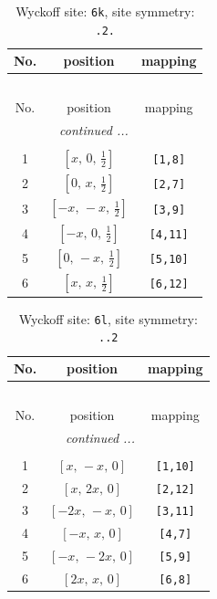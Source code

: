 \documentclass[fleqn,8pt]{jsarticle}
\begin{document}
\renewcommand{\arraystretch}{1.2}
\begin{longtable}{ccc}
\caption{Wyckoff site: {\tt 6k}, site symmetry: {\tt .2.}}
 \\
 \hline \hline
No. & position & mapping \\ \hline \endfirsthead

\multicolumn{2}{l}{\tablename\ \thetable{}} \\
 \hline \hline
No. & position & mapping \\ \hline \endhead

 \hline \hline
\multicolumn{2}{r}{\footnotesize\it continued ...} \\ \endfoot

 \hline \hline
\multicolumn{2}{r}{} \\ \endlastfoot

1 & $\left[ x,\, 0,\, \frac{1}{2} \right]$ & {\tt [1,8]} \\ \hline
2 & $\left[ 0,\, x,\, \frac{1}{2} \right]$ & {\tt [2,7]} \\ \hline
3 & $\left[ - x,\, - x,\, \frac{1}{2} \right]$ & {\tt [3,9]} \\ \hline
4 & $\left[ - x,\, 0,\, \frac{1}{2} \right]$ & {\tt [4,11]} \\ \hline
5 & $\left[ 0,\, - x,\, \frac{1}{2} \right]$ & {\tt [5,10]} \\ \hline
6 & $\left[ x,\, x,\, \frac{1}{2} \right]$ & {\tt [6,12]} \\
\end{longtable}
\renewcommand{\arraystretch}{1.2}
\begin{longtable}{ccc}
\caption{Wyckoff site: {\tt 6l}, site symmetry: {\tt ..2}}
 \\
 \hline \hline
No. & position & mapping \\ \hline \endfirsthead

\multicolumn{2}{l}{\tablename\ \thetable{}} \\
 \hline \hline
No. & position & mapping \\ \hline \endhead

 \hline \hline
\multicolumn{2}{r}{\footnotesize\it continued ...} \\ \endfoot

 \hline \hline
\multicolumn{2}{r}{} \\ \endlastfoot

1 & $\left[ x,\, - x,\, 0 \right]$ & {\tt [1,10]} \\ \hline
2 & $\left[ x,\, 2 x,\, 0 \right]$ & {\tt [2,12]} \\ \hline
3 & $\left[ - 2 x,\, - x,\, 0 \right]$ & {\tt [3,11]} \\ \hline
4 & $\left[ - x,\, x,\, 0 \right]$ & {\tt [4,7]} \\ \hline
5 & $\left[ - x,\, - 2 x,\, 0 \right]$ & {\tt [5,9]} \\ \hline
6 & $\left[ 2 x,\, x,\, 0 \right]$ & {\tt [6,8]} \\
\end{longtable}
\end{document}
